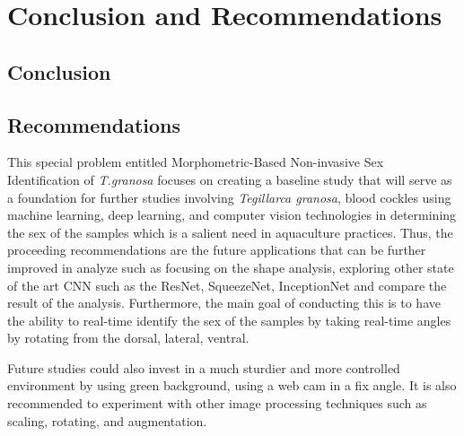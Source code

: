 \chapter{Conclusion and Recommendations}


\section{Conclusion}


\section{Recommendations}

This special problem entitled Morphometric-Based Non-invasive Sex Identification of \textit{T.granosa} focuses on creating a baseline study that will serve as a foundation for further studies involving \textit{Tegillarca granosa}, blood cockles using machine learning, deep learning, and computer vision technologies in determining the sex of the samples which is a salient need in aquaculture practices. Thus, the proceeding recommendations are the future applications that can be further improved in analyze such as focusing on the shape analysis, exploring other state of the art CNN such as the ResNet, SqueezeNet, InceptionNet and compare the result of the analysis. Furthermore, the main goal of conducting this is to have the ability to real-time identify the sex of the samples by taking real-time angles by rotating from the dorsal, lateral, ventral. 

Future studies could also invest in a much sturdier and more controlled environment by using green background, using a web cam in a fix angle. It is also recommended to experiment with other image processing techniques such as scaling, rotating, and augmentation. 


